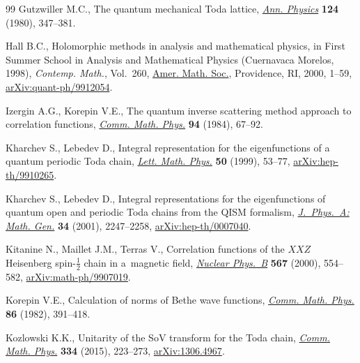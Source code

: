 \documentclass[pdftex]{sigma}%
\numberwithin{equation}{section}
\begin{document}
\begin{thebibliography}{99}
Gutzwiller M.C., The quantum mechanical {T}oda lattice, \href{https://doi.org/10.1016/0003-4916(80)90214-6}{\textit{Ann. Physics}}
 \textbf{124} (1980), 347--381.

Hall B.C., Holomorphic methods in analysis and mathematical physics, in First
 {S}ummer {S}chool in {A}nalysis and {M}athematical {P}hysics ({C}uernavaca
 {M}orelos, 1998), \textit{Contemp. Math.}, Vol.~260, \href{https://doi.org/10.1090/conm/260/04156}{Amer. Math. Soc.},
 Providence, RI, 2000, 1--59, \href{https://arxiv.org/abs/quant-ph/9912054}{arXiv:quant-ph/9912054}.

Izergin A.G., Korepin V.E., The quantum inverse scattering method approach to
 correlation functions, \href{https://doi.org/10.1007/BF01212350}{\textit{Comm. Math. Phys.}} \textbf{94} (1984), 67--92.

Kharchev S., Lebedev D., Integral representation for the eigenfunctions of a
 quantum periodic {T}oda chain, \href{https://doi.org/10.1023/A:1007679024609}{\textit{Lett. Math. Phys.}} \textbf{50} (1999),
 53--77, \href{https://arxiv.org/abs/hep-th/9910265}{arXiv:hep-th/9910265}.

Kharchev S., Lebedev D., Integral representations for the eigenfunctions of
 quantum open and periodic {T}oda chains from the {QISM} formalism,
 \href{https://doi.org/10.1088/0305-4470/34/11/317}{\textit{J.~Phys.~A: Math. Gen.}} \textbf{34} (2001), 2247--2258,
 \href{https://arxiv.org/abs/hep-th/0007040}{arXiv:hep-th/0007040}.

Kitanine N., Maillet J.M., Terras V., Correlation functions of the {$XXZ$}
 {H}eisenberg spin-{$\frac{1}{2}$} chain in a~magnetic field, \href{https://doi.org/10.1016/S0550-3213(99)00619-7}{\textit{Nuclear
 Phys.~B}} \textbf{567} (2000), 554--582, \href{https://arxiv.org/abs/math-ph/9907019}{arXiv:math-ph/9907019}.

Korepin V.E., Calculation of norms of {B}ethe wave functions, \href{https://doi.org/10.1007/BF01212176}{\textit{Comm.
 Math. Phys.}} \textbf{86} (1982), 391--418.

Kozlowski K.K., Unitarity of the {S}o{V} transform for the {T}oda chain,
 \href{https://doi.org/10.1007/s00220-014-2134-6}{\textit{Comm. Math. Phys.}} \textbf{334} (2015), 223--273, \href{https://arxiv.org/abs/1306.4967}{arXiv:1306.4967}.


\end{thebibliography}
\end{document}
